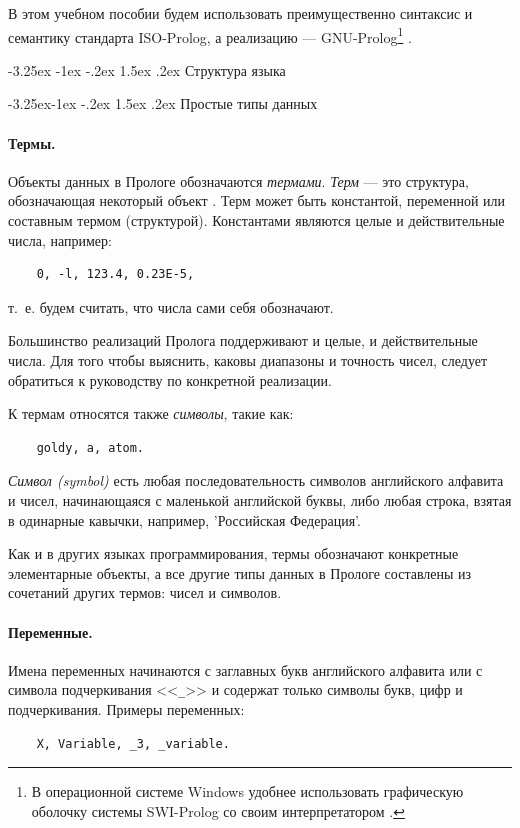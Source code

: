 \documentclass[12pt, openany, twoside]{book} %
\makeatletter
\renewcommand\section{\@startsection {section}{1}{\z@}%
                                   {-3.25ex \@plus -1ex \@minus -.2ex}%
                                   {1.5ex \@plus.2ex}%
                                   {\normalfont\large\bfseries}}
\renewcommand\subsection{\@startsection{subsection}{2}{\z@}%
                                     {-3.25ex\@plus -1ex \@minus -.2ex}%
                                     {1.5ex \@plus .2ex}%
                                     {\normalfont\normalsize\bfseries}}
\makeatother
\begin{document}
В этом учебном пособии будем использовать преимущественно синтаксис и семантику стандарта ISO-Prolog, а реализацию --- GNU-Prolog\footnote{В операционной системе Windows удобнее использовать графическую оболочку системы SWI-Prolog со своим интерпретатором \cite{SWIP}.} \cite{GNUP}.

\section{Структура языка}

\subsection{Простые типы данных}
\paragraph{Термы.}
Объекты данных в Прологе обозначаются \emph{термами}. {\em Терм} --- это структура, обозначающая некоторый объект \cite{DDW}. Терм может быть константой, переменной или составным термом (структурой). Константами являются целые и действительные числа, например:
{\tt\begin{verbatim}
    0, -l, 123.4, 0.23E-5,
\end{verbatim}}
\noindent т.~е. будем считать, что числа сами себя обозначают.

Большинство реализаций Пролога поддерживают и целые, и действительные числа. Для того чтобы выяснить, каковы диапазоны и точность чисел, следует обратиться к руководству по конкретной реализации.

К термам относятся также \emph{символы}, такие как:
{\tt\begin{verbatim}
    goldy, а, atom.
\end{verbatim}}

{\em Символ (symbol)} есть любая последовательность символов английского алфавита и чисел, начинающаяся с маленькой английской буквы, либо любая строка, взятая в одинарные кавычки, например, 'Российская Федерация'.

Как и в других языках программирования, термы обозначают конкретные элементарные объекты, а все другие типы данных в Прологе составлены из сочетаний других термов: чисел и символов.

\paragraph{Переменные.}
Имена переменных начинаются с заглавных букв английского алфавита или с символа подчеркивания <<{\tt \_}>> и содержат только символы букв, цифр и подчеркивания. Примеры переменных:
{\tt\begin{verbatim}
    X, Variable, _3, _variable.
\end{verbatim}}
\end{document}

